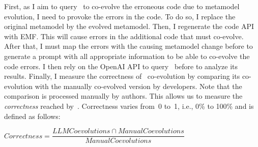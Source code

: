 First, as I aim to query \LLM~to co-evolve the erroneous code due to metamodel evolution, I need to provoke the errors in the code. To do so, I replace the original metamodel by the evolved metamodel. Then, I regenerate the code API with EMF. This will cause errors in the additional code that must co-evolve. 
%
After that, I must map the errors with the causing metamodel change before to generate a prompt with all appropriate information to be able to co-evolve the code errors. I then rely on the OpenAI API to query \LLM~before to analyze its results. 
%
%
Finally, I measure the correctness of \LLM~co-evolution by comparing its co-evolution with the manually co-evolved version by developers. Note that the comparison is processed manually by authors. This allows us to measure the \emph{correctness} reached by~\LLM. %
Correctness varies from~0 to~1, i.e., 0\% to 100\% and is defined as follows:
\vspace{0.5em}

\noindent $ Correctness = \dfrac{LLM Coevolutions \cap Manual Coevolutions}{Manual Coevolutions} $

\vspace{0.5em}

